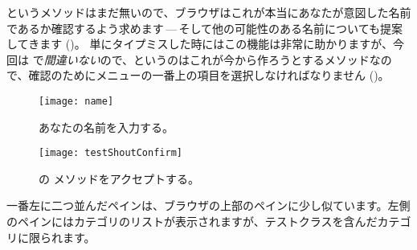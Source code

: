 \documentclass[a4paper,10pt,twoside]{book}
\begin{document}
 というメソッドはまだ無いので、ブラウザはこれが本当にあなたが意図した名前であるか確認するよう求めます\,---\,そして他の可能性のある名前についても提案してきます ()。
単にタイプミスした時にはこの機能は非常に助かりますが、今回は  で\emph{間違いない}ので、というのはこれが今から作ろうとするメソッドなので、確認のためにメニューの一番上の項目を選択しなければなりません ()。



\begin{figure}[htb]
\centerline {\texttt{[image: name]}}
\caption{あなたの名前を入力する。}
\end{figure}

\begin{figure}[htb]
\centerline {\texttt{[image: testShoutConfirm]}}
\caption{ の  メソッドをアクセプトする。}
\end{figure}




一番左に二つ並んだペインは、ブラウザの上部のペインに少し似ています。左側のペインにはカテゴリのリストが表示されますが、テストクラスを含んだカテゴリに限られます。

\end{document}
